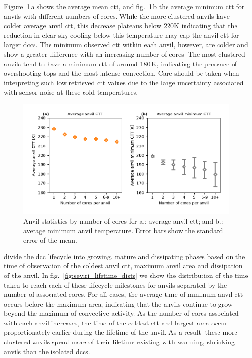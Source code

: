 \documentclass[acp, manuscript]{copernicus}
\begin{document}
Figure~\ref{fig:seviri_anvil_ctt_stats}\,a shows the average mean \acrshort{ctt}, and fig.~\ref{fig:seviri_anvil_ctt_stats}\,b the average minimum \acrshort{ctt} for anvils with different numbers of cores. 
While the more clustered anvils have colder average anvil \acrshort{ctt}, this decrease plateaus below 220K indicating that the reduction in clear-sky cooling below this temperature may cap the anvil \acrshort{ctt} for larger \acrshort{dcc}s. 
The minimum observed \acrshort{ctt} within each anvil, however, are colder and show a greater difference with an increasing number of cores. 
The most clustered anvils tend to have a minimum \acrshort{ctt} of around 180\,\unit{K}, indicating the presence of overshooting tops and the most intense convection. 
Care should be taken when interpreting such low retrieved \acrshort{ctt} values due to the large uncertainty associated with sensor noise at these cold temperatures.


\begin{figure}[tp]
    \includegraphics[width=12cm]{figures/fig07.pdf}
    \caption[
    Anvil statistics by number of cores for average anvil \acrshort{ctt} and average minimum anvil temperature
    ]{
    Anvil statistics by number of cores for a.: average anvil \acrshort{ctt}; and b.: average minimum anvil temperature. Error bars show the standard error of the mean.
    }
    \label{fig:seviri_anvil_ctt_stats}
\end{figure}


\citet{futyan_deep_2007} divide the \acrshort{dcc} lifecycle into growing, mature and dissipating phases based on the time of observation of the coldest anvil \acrshort{ctt}, maximum anvil area and dissipation of the anvil. 
In fig.~\ref{fig:seviri_lifetime_dists} we show the distribution of the time taken to reach each of these lifecycle milestones for anvils separated by the number of associated cores. 
For all cases, the average time of minimum anvil \acrshort{ctt} occurs before the maximum area, indicating that the anvils continue to grow beyond the maximum of convective activity. 
As the number of cores associated with each anvil increases, the time of the coldest \acrshort{ctt} and largest area occur proportionately earlier during the lifetime of the anvil. 
As a result, these more clustered anvils spend more of their lifetime existing with warming, shrinking anvils than the isolated \acrshort{dcc}s.
\end{document}
